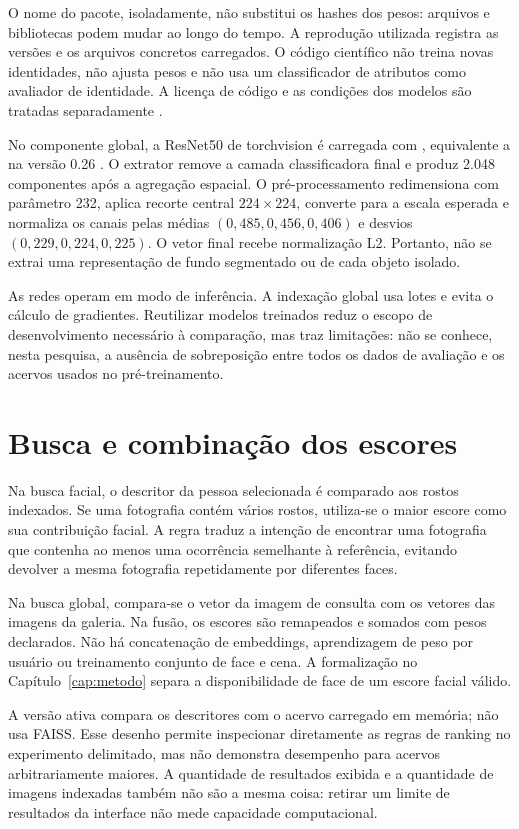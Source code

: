 O nome do pacote, isoladamente, não substitui os hashes dos pesos: arquivos e bibliotecas podem mudar ao longo do tempo. A reprodução utilizada registra as versões e os arquivos concretos carregados. O código científico não treina novas identidades, não ajusta pesos e não usa um classificador de atributos como avaliador de identidade. A licença de código e as condições dos modelos são tratadas separadamente \cite{InsightFace}.

No componente global, a ResNet50 de torchvision é carregada com , equivalente a  na versão 0.26 \cite{Torchvision}. O extrator remove a camada classificadora final e produz 2.048 componentes após a agregação espacial. O pré-processamento redimensiona com parâmetro 232, aplica recorte central $224\times224$, converte para a escala esperada e normaliza os canais pelas médias $(0{,}485,0{,}456,0{,}406)$ e desvios $(0{,}229,0{,}224,0{,}225)$. O vetor final recebe normalização L2. Portanto, não se extrai uma representação de fundo segmentado ou de cada objeto isolado.

As redes operam em modo de inferência. A indexação global usa lotes e evita o cálculo de gradientes. Reutilizar modelos treinados reduz o escopo de desenvolvimento necessário à comparação, mas traz limitações: não se conhece, nesta pesquisa, a ausência de sobreposição entre todos os dados de avaliação e os acervos usados no pré-treinamento.

\section{Busca e combinação dos escores}
Na busca facial, o descritor da pessoa selecionada é comparado aos rostos indexados. Se uma fotografia contém vários rostos, utiliza-se o maior escore como sua contribuição facial. A regra traduz a intenção de encontrar uma fotografia que contenha ao menos uma ocorrência semelhante à referência, evitando devolver a mesma fotografia repetidamente por diferentes faces.

Na busca global, compara-se o vetor da imagem de consulta com os vetores das imagens da galeria. Na fusão, os escores são remapeados e somados com pesos declarados. Não há concatenação de embeddings, aprendizagem de peso por usuário ou treinamento conjunto de face e cena. A formalização no Capítulo~\ref{cap:metodo} separa a disponibilidade de face de um escore facial válido.

A versão ativa compara os descritores com o acervo carregado em memória; não usa FAISS. Esse desenho permite inspecionar diretamente as regras de ranking no experimento delimitado, mas não demonstra desempenho para acervos arbitrariamente maiores. A quantidade de resultados exibida e a quantidade de imagens indexadas também não são a mesma coisa: retirar um limite de resultados da interface não mede capacidade computacional.

